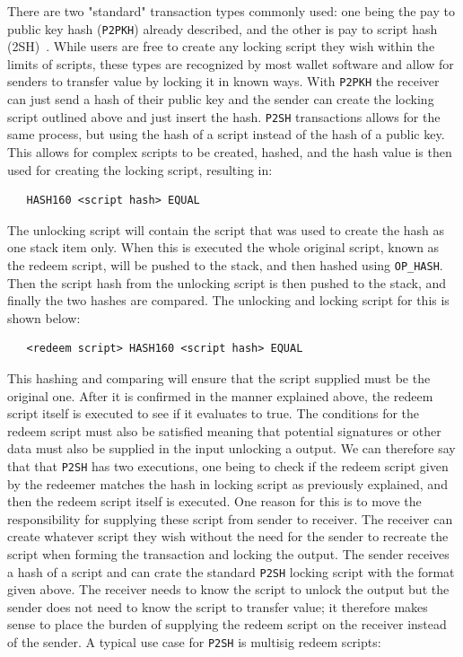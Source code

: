 There are two "standard" transaction types commonly used: one being the pay to public key hash ({\tt P2PKH}) already described, and the other is pay to script hash ({\ttP2SH})~\cite{BIP16}. While users are free to create any locking script they wish within the limits of scripts, these types are recognized by most wallet software and allow for senders to transfer value by locking it in known ways. With {\tt P2PKH} the receiver can just send a hash of their public key and the sender can create the locking script outlined above and just insert the hash. {\tt P2SH} transactions allows for the same process, but using the hash of a script instead of the hash of a public key. This allows for complex scripts to be created, hashed, and the hash value is then used for creating the locking script, resulting in:

\begin{verbatim}
   HASH160 <script hash> EQUAL
\end{verbatim}

The unlocking script will contain the script that was used to create the hash as one stack item only. When this is executed the whole original script, known as the redeem script, will be pushed to the stack, and then hashed using {\tt OP\_HASH}. Then the script hash from the unlocking script is then pushed to the stack, and finally the two hashes are compared. The unlocking and locking script for this is shown below:

\begin{verbatim}
   <redeem script> HASH160 <script hash> EQUAL
\end{verbatim}

This hashing and comparing will ensure that the script supplied must be the original one. After it is confirmed in the manner explained above, the redeem script itself is executed to see if it evaluates to true. The conditions for the redeem script must also be satisfied meaning that potential signatures or other data must also be supplied in the input unlocking a output. We can therefore say that that {\tt P2SH} has two executions, one being to check if the redeem script given by the redeemer matches the hash in locking script as previously explained, and then the redeem script itself is executed.
One reason for this is to move the responsibility for supplying these script from sender to receiver. The receiver can create whatever script they wish without the need for the sender to recreate the script when forming the transaction and locking the output. The sender receives a hash of a script and can crate the standard {\tt P2SH} locking script with the format given above. The receiver needs to know the script to unlock the output but the sender does not need to know the script to transfer value; it therefore makes sense to place the burden of supplying the redeem script on the receiver instead of the sender. A typical use case for {\tt P2SH} is multisig redeem scripts: 

